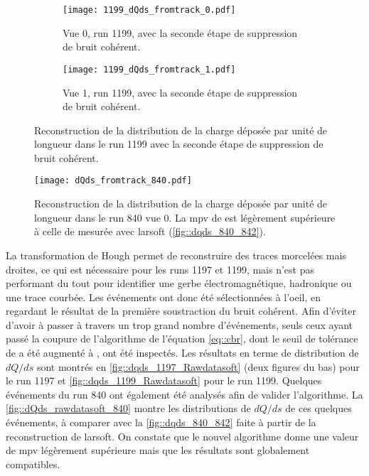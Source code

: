       \begin{figure}[htbp]
        \centering
        \begin{subfigure}[t]{0.48\textwidth}
          \centering
          \texttt{[image: 1199\_dQds\_fromtrack\_0.pdf]}
          \caption{Vue 0, run 1199, avec la seconde étape de suppression de bruit cohérent.}
        \end{subfigure}\hfill
        \begin{subfigure}[t]{0.48\textwidth}
          \centering
          \texttt{[image: 1199\_dQds\_fromtrack\_1.pdf]}
          \caption{Vue 1, run 1199, avec la seconde étape de suppression de bruit cohérent.}
        \end{subfigure}
        \caption[Reconstruction de la distribution de la charge déposée par unité de longueur dans le run 1199]{\label{fig::dqds_1199_Rawdatasoft}Reconstruction de la distribution de la charge déposée par unité de longueur dans le run 1199 avec la seconde étape de suppression de bruit cohérent.}
      \end{figure}

      \begin{figure}[htbp]      
        \centering
        \texttt{[image: dQds\_fromtrack\_840.pdf]}
        \caption[Test de l'algorithme sur le run 840]{\label{fig::dQds_rawdatasoft_840}Reconstruction de la distribution de la charge déposée par unité de longueur dans le run 840 vue 0. La \gls{mpv} de  est légèrement supérieure à celle de  mesurée avec \gls{larsoft} (\autoref{fig::dqds_840_842}).}
      \end{figure}

      La transformation de Hough permet de reconstruire des traces morcelées mais droites, ce qui est nécessaire pour les runs 1197 et 1199, mais n'est pas performant du tout pour identifier une gerbe électromagnétique, hadronique ou une trace courbée. Les événements ont donc été sélectionnées à l'oeil, en regardant le résultat de la première soustraction du bruit cohérent. Afin d'éviter d'avoir à passer à travers un trop grand nombre d'événements, seuls ceux ayant passé la coupure de l'algorithme de l'équation \eqref{eq::cbr}, dont le seuil de tolérance de  a été augmenté à , ont été inspectés. Les résultats en terme de distribution de $dQ/ds$ sont montrés en \autoref{fig::dqds_1197_Rawdatasoft} (deux figures du bas) pour le run 1197 et \autoref{fig::dqds_1199_Rawdatasoft} pour le run 1199. Quelques événements du run 840 ont également été analysés afin de valider l'algorithme. La \autoref{fig::dQds_rawdatasoft_840} montre les distributions de $dQ/ds$ de ces quelques événements, à comparer avec la \autoref{fig::dqds_840_842} faite à partir de la reconstruction de \gls{larsoft}. On constate que le nouvel algorithme donne une valeur de \gls{mpv} légèrement supérieure mais que les résultats sont globalement compatibles. 

